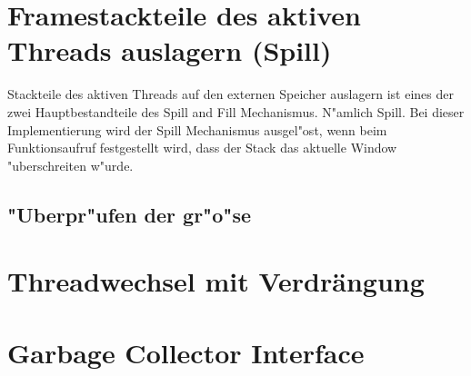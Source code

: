 \section{Framestackteile des aktiven Threads auslagern (Spill)}

Stackteile des aktiven Threads auf den externen Speicher auslagern ist eines der zwei Hauptbestandteile des Spill and Fill Mechanismus. N"amlich Spill. Bei dieser Implementierung wird der Spill Mechanismus ausgel"ost, wenn beim Funktionsaufruf festgestellt wird, dass der Stack das aktuelle Window "uberschreiten w"urde.

\subsection{"Uberpr"ufen der gr"o"se}


\section{Threadwechsel mit Verdr\"angung}

\section{Garbage Collector Interface}